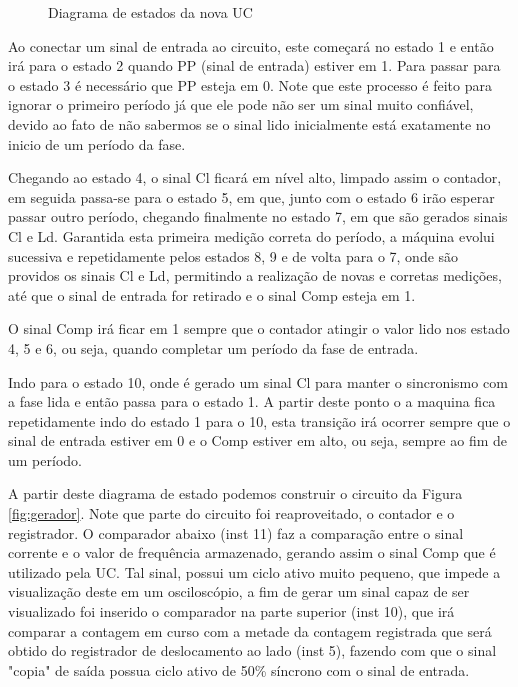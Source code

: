 \documentclass[12pt,a4paper,openany]{abntex2}
\begin{document}
\begin{figure}[!htp]
	\centering
	\caption{Diagrama de estados da nova UC}
	\label{fig:diagrama-de-estado1}
\end{figure}

Ao conectar um sinal de entrada ao circuito, este começará no estado 1 e então irá para o estado 2 quando PP (sinal de entrada) estiver em 1. Para passar para o estado 3 é necessário que PP esteja em 0. Note que este processo é feito para ignorar o primeiro período já que ele pode não ser um sinal muito confiável, devido ao fato de não sabermos se o sinal lido inicialmente está exatamente no inicio de um período da fase.

Chegando ao estado 4, o sinal Cl ficará em nível alto, limpado assim o contador, em seguida passa-se para o estado 5, em que, junto com o estado 6 irão esperar passar outro período, chegando finalmente no estado 7, em que são gerados sinais Cl e Ld. Garantida esta primeira medição correta do período, a máquina evolui sucessiva e repetidamente pelos estados 8, 9 e de volta para o 7, onde são providos os sinais Cl e Ld, permitindo a realização de novas e corretas medições, até que o sinal de entrada for retirado e o sinal Comp esteja em 1.

O sinal Comp irá ficar em 1 sempre que o contador atingir o valor lido nos estado 4, 5 e 6, ou seja, quando completar um período da fase de entrada.

Indo para o estado 10, onde é gerado um sinal Cl para manter o sincronismo com a fase lida e então passa para o estado 1. A partir deste ponto o a maquina fica repetidamente indo do estado 1 para o 10, esta transição irá ocorrer sempre que o sinal de entrada estiver em 0 e o Comp estiver em alto, ou seja, sempre ao fim de um período.

A partir deste diagrama de estado podemos construir o circuito da Figura \ref{fig:gerador}. Note que parte do circuito foi reaproveitado, o contador e o registrador. O comparador abaixo (inst 11) faz a comparação entre o sinal corrente e o valor de frequência armazenado, gerando assim o sinal Comp que é utilizado pela UC. Tal sinal, possui um ciclo ativo muito pequeno, que impede a visualização deste em um osciloscópio, a fim de gerar um sinal capaz de ser visualizado foi inserido o comparador na parte superior (inst 10), que irá comparar a contagem em curso com a metade da contagem registrada que será obtido do registrador de deslocamento ao lado (inst 5), fazendo com que o sinal "copia" de saída possua ciclo ativo de 50\% síncrono com o sinal de entrada.
\end{document}
